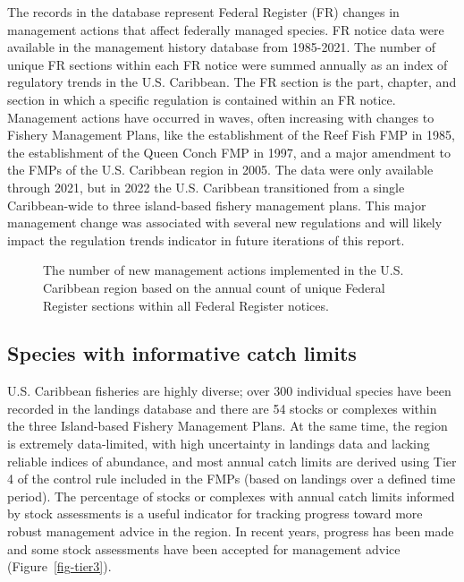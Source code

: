 \documentclass[
  letterpaper,
  oneside,
  open=any]{scrbook}
\begin{document}
The records in the database represent Federal Register (FR) changes in
management actions that affect federally managed species. FR notice data
were available in the management history database from 1985-2021. The
number of unique FR sections within each FR notice were summed annually
as an index of regulatory trends in the U.S. Caribbean. The FR section
is the part, chapter, and section in which a specific regulation is
contained within an FR notice. Management actions have occurred in
waves, often increasing with changes to Fishery Management Plans, like
the establishment of the Reef Fish FMP in 1985, the establishment of the
Queen Conch FMP in 1997, and a major amendment to the FMPs of the U.S.
Caribbean region in 2005. The data were only available through 2021, but
in 2022 the U.S. Caribbean transitioned from a single Caribbean-wide to
three island-based fishery management plans. This major management
change was associated with several new regulations and will likely
impact the regulation trends indicator in future iterations of this
report.

\begin{figure}


\caption{\label{fig-FR}The number of new management actions implemented
in the U.S. Caribbean region based on the annual count of unique Federal
Register sections within all Federal Register notices.}

\end{figure}%

\subsection{Species with informative catch
limits}\label{species-with-informative-catch-limits}

U.S. Caribbean fisheries are highly diverse; over 300 individual species
have been recorded in the landings database and there are 54 stocks or
complexes within the three Island-based Fishery Management Plans. At the
same time, the region is extremely data-limited, with high uncertainty
in landings data and lacking reliable indices of abundance, and most
annual catch limits are derived using Tier 4 of the control rule
included in the FMPs (based on landings over a defined time period). The
percentage of stocks or complexes with annual catch limits informed by
stock assessments is a useful indicator for tracking progress toward
more robust management advice in the region. In recent years, progress
has been made and some stock assessments have been accepted for
management advice (Figure~\ref{fig-tier3}).
\end{document}

